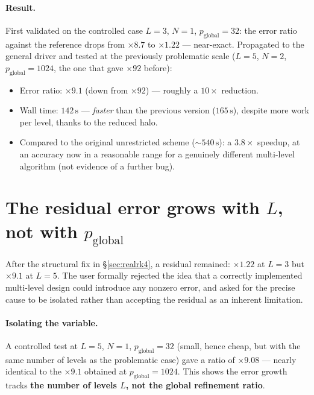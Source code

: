\documentclass[11pt]{article}
\begin{document}
\paragraph{Result.} First validated on the controlled case $L=3$, $N=1$,
$p_{\text{global}}=32$: the error ratio against the reference drops from
$\times 8.7$ to $\times 1.22$ --- near-exact. Propagated to the general
driver and tested at the previously problematic scale ($L=5$, $N=2$,
$p_{\text{global}}=1024$, the one that gave $\times 92$ before):
\begin{itemize}
  \item Error ratio: $\times 9.1$ (down from $\times 92$) --- roughly a
  $10\times$ reduction.
  \item Wall time: $142\,\mathrm{s}$ --- \emph{faster} than the previous
  version ($165\,\mathrm{s}$), despite more work per level, thanks to the
  reduced halo.
  \item Compared to the original unrestricted scheme ($\sim 540\,\mathrm{s}$):
  a $3.8\times$ speedup, at an accuracy now in a reasonable range for a
  genuinely different multi-level algorithm (not evidence of a further
  bug).
\end{itemize}

\section{The residual error grows with $L$, not with $p_{\text{global}}$}
\label{sec:lgrowth}

After the structural fix in \S\ref{sec:realrk4}, a residual remained:
$\times 1.22$ at $L=3$ but $\times 9.1$ at $L=5$. The user formally
rejected the idea that a correctly implemented multi-level design could
introduce any nonzero error, and asked for the precise cause to be
isolated rather than accepting the residual as an inherent limitation.

\paragraph{Isolating the variable.} A controlled test at $L=5$, $N=1$,
$p_{\text{global}}=32$ (small, hence cheap, but with the same number of
levels as the problematic case) gave a ratio of $\times 9.08$ ---
nearly identical to the $\times 9.1$ obtained at $p_{\text{global}}=1024$.
This shows the error growth tracks \textbf{the number of levels $L$,
not the global refinement ratio}.
\end{document}
